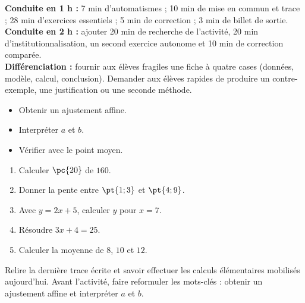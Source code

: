 \ifmxteacher
\begin{method}
\textbf{Conduite en 1 h :} 7 min d'automatismes ; 10 min de mise en commun et trace ; 28 min d'exercices essentiels ; 5 min de correction ; 3 min de billet de sortie.\\
\textbf{Conduite en 2 h :} ajouter 20 min de recherche de l'activité, 20 min d'institutionnalisation, un second exercice autonome et 10 min de correction comparée.\\
\textbf{Différenciation :} fournir aux élèves fragiles une fiche à quatre cases (données, modèle, calcul, conclusion). Demander aux élèves rapides de produire un contre-exemple, une justification ou une seconde méthode.
\end{method}
\fi
{}
\begin{objectives}\begin{itemize}\item Obtenir un ajustement affine.\item Interpréter $a$ et $b$.\item Vérifier avec le point moyen.\end{itemize}\end{objectives}
\begin{fluency}\begin{enumerate}\item Calculer $\pc{20}$ de $160$. \item Donner la pente entre $\pt{1;3}$ et $\pt{4;9}$. \item Avec $y=2x+5$, calculer $y$ pour $x=7$. \item Résoudre $3x+4=25$. \item Calculer la moyenne de $8$, $10$ et $12$. \end{enumerate}\end{fluency}
\begin{prerequisites}Relire la dernière trace écrite et savoir effectuer les calculs élémentaires mobilisés aujourd'hui. Avant l'activité, faire reformuler les mots-clés : obtenir un ajustement affine et interpréter $a$ et $b$.\end{prerequisites}

